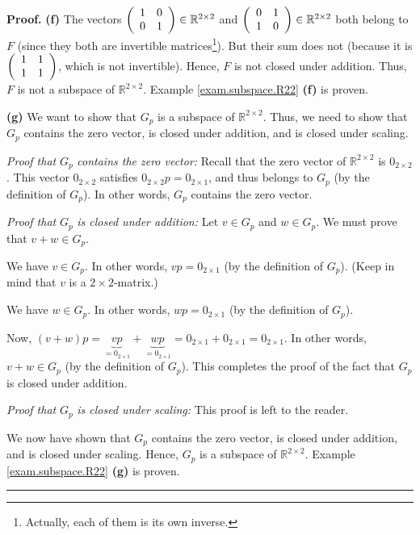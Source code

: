 \documentclass[numbers=enddot,12pt,final,onecolumn,notitlepage]{scrartcl}%
\theoremstyle{definition}
\newenvironment{proof}[1][Proof]{\noindent\textbf{#1.} }{\ \rule{0.5em}{0.5em}}
\begin{document}
\begin{proof}
\textbf{(f)} The vectors $\left(
\begin{array}
[c]{cc}%
1 & 0\\
0 & 1
\end{array}
\right)  \in\mathbb{R}^{2\times2}$ and $\left(
\begin{array}
[c]{cc}%
0 & 1\\
1 & 0
\end{array}
\right)  \in\mathbb{R}^{2\times2}$ both belong to $F$ (since they both are
invertible matrices\footnote{Actually, each of them is its own inverse.}). But
their sum does not (because it is $\left(
\begin{array}
[c]{cc}%
1 & 1\\
1 & 1
\end{array}
\right)  $, which is not invertible). Hence, $F$ is not closed under addition.
Thus, $F$ is not a subspace of $\mathbb{R}^{2\times2}$. Example
\ref{exam.subspace.R22} \textbf{(f)} is proven.

\textbf{(g)} We want to show that $G_{p}$ is a subspace of $\mathbb{R}%
^{2\times2}$. Thus, we need to show that $G_{p}$ contains the zero vector, is
closed under addition, and is closed under scaling.

\textit{Proof that }$G_{p}$\textit{ contains the zero vector:} Recall that the
zero vector of $\mathbb{R}^{2\times2}$ is $0_{2\times2}$. This vector
$0_{2\times2}$ satisfies $0_{2\times2}p=0_{2\times1}$, and thus belongs to
$G_{p}$ (by the definition of $G_{p}$). In other words, $G_{p}$ contains the
zero vector.

\textit{Proof that }$G_{p}$ \textit{is closed under addition:} Let $v\in
G_{p}$ and $w\in G_{p}$. We must prove that $v+w\in G_{p}$.

We have $v\in G_{p}$. In other words, $vp=0_{2\times1}$ (by the definition of
$G_{p}$). (Keep in mind that $v$ is a $2\times2$-matrix.)

We have $w\in G_{p}$. In other words, $wp=0_{2\times1}$ (by the definition of
$G_{p}$).

Now, $\left(  v+w\right)  p=\underbrace{vp}_{=0_{2\times1}}+\underbrace{wp}%
_{=0_{2\times1}}=0_{2\times1}+0_{2\times1}=0_{2\times1}$. In other words,
$v+w\in G_{p}$ (by the definition of $G_{p}$). This completes the proof of the
fact that $G_{p}$ is closed under addition.

\textit{Proof that }$G_{p}$ \textit{is closed under scaling:} This proof is
left to the reader.

We now have shown that $G_{p}$ contains the zero vector, is closed under
addition, and is closed under scaling. Hence, $G_{p}$ is a subspace of
$\mathbb{R}^{2\times2}$. Example \ref{exam.subspace.R22} \textbf{(g)} is proven.
\end{proof}
\end{document}
